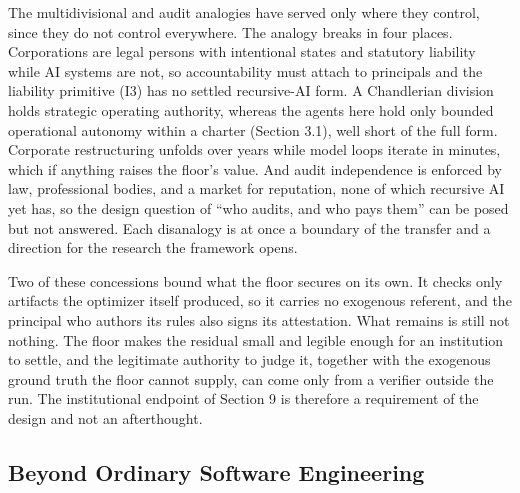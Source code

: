 \documentclass[11pt]{article}
\begin{document}
The multidivisional and audit analogies have served only where they control, since they do not control everywhere. The analogy breaks in four places. Corporations are legal persons with intentional states and statutory liability while AI systems are not, so accountability must attach to principals and the liability primitive (I3) has no settled recursive-AI form. A Chandlerian division holds strategic operating authority, whereas the agents here hold only bounded operational autonomy within a charter (Section 3.1), well short of the full form. Corporate restructuring unfolds over years while model loops iterate in minutes, which if anything raises the floor's value. And audit independence is enforced by law, professional bodies, and a market for reputation, none of which recursive AI yet has, so the design question of ``who audits, and who pays them'' can be posed but not answered. Each disanalogy is at once a boundary of the transfer and a direction for the research the framework opens.

Two of these concessions bound what the floor secures on its own. It checks only artifacts the optimizer itself produced, so it carries no exogenous referent, and the principal who authors its rules also signs its attestation. What remains is still not nothing. The floor makes the residual small and legible enough for an institution to settle, and the legitimate authority to judge it, together with the exogenous ground truth the floor cannot supply, can come only from a verifier outside the run. The institutional endpoint of Section 9 is therefore a requirement of the design and not an afterthought.

\subsection{Beyond Ordinary Software Engineering}
\end{document}
